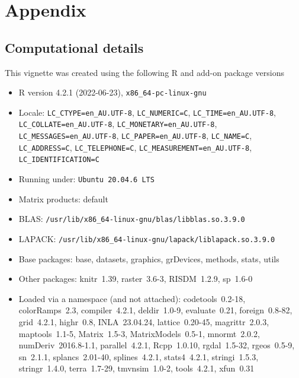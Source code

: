 \documentclass[article,shortnames,nojss]{jss}\usepackage[]{graphicx}\usepackage[]{xcolor}
\begin{document}


\section*{Appendix}
  
\subsection*{Computational details}
This vignette was created using the following R and add-on package versions
  
\begin{itemize}\raggedright
  \item R version 4.2.1 (2022-06-23), \verb|x86_64-pc-linux-gnu|
  \item Locale: \verb|LC_CTYPE=en_AU.UTF-8|, \verb|LC_NUMERIC=C|, \verb|LC_TIME=en_AU.UTF-8|, \verb|LC_COLLATE=en_AU.UTF-8|, \verb|LC_MONETARY=en_AU.UTF-8|, \verb|LC_MESSAGES=en_AU.UTF-8|, \verb|LC_PAPER=en_AU.UTF-8|, \verb|LC_NAME=C|, \verb|LC_ADDRESS=C|, \verb|LC_TELEPHONE=C|, \verb|LC_MEASUREMENT=en_AU.UTF-8|, \verb|LC_IDENTIFICATION=C|
  \item Running under: \verb|Ubuntu 20.04.6 LTS|
  \item Matrix products: default
  \item BLAS:   \verb|/usr/lib/x86_64-linux-gnu/blas/libblas.so.3.9.0|
  \item LAPACK: \verb|/usr/lib/x86_64-linux-gnu/lapack/liblapack.so.3.9.0|
  \item Base packages: base, datasets, graphics, grDevices, methods,
    stats, utils
  \item Other packages: knitr~1.39, raster~3.6-3, RISDM~1.2.9, sp~1.6-0
  \item Loaded via a namespace (and not attached): codetools~0.2-18,
    colorRamps~2.3, compiler~4.2.1, deldir~1.0-9, evaluate~0.21,
    foreign~0.8-82, grid~4.2.1, highr~0.8, INLA~23.04.24,
    lattice~0.20-45, magrittr~2.0.3, maptools~1.1-5, Matrix~1.5-3,
    MatrixModels~0.5-1, mnormt~2.0.2, numDeriv~2016.8-1.1,
    parallel~4.2.1, Rcpp~1.0.10, rgdal~1.5-32, rgeos~0.5-9, sn~2.1.1,
    splancs~2.01-40, splines~4.2.1, stats4~4.2.1, stringi~1.5.3,
    stringr~1.4.0, terra~1.7-29, tmvnsim~1.0-2, tools~4.2.1, xfun~0.31
\end{itemize}

    
\end{document}
